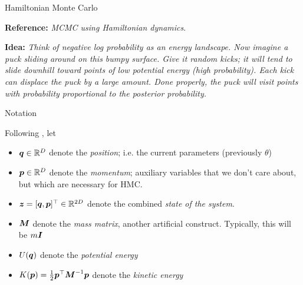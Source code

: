 \documentclass[aspectratio=169]{beamer}
\begin{document}
\begin{frame}{Hamiltonian Monte Carlo}
    
\textbf{Reference:} \citet{Neal2012-ev} \textit{{MCMC} using Hamiltonian dynamics}.

\textbf{Idea: } \textit{Think of negative log probability as an \textit{energy landscape}. Now imagine a puck sliding around on this bumpy surface. Give it random kicks; it will tend to slide downhill toward points of low potential energy (high probability). Each kick can displace the puck by a large amount. Done properly, the puck will visit points with probability proportional to the posterior probability. }
    
\end{frame}

\begin{frame}{Notation}
    
    Following \citet{Neal2012-ev}, let
    
    \begin{itemize}
        \item $\boldsymbol{q} \in \mathbb{R}^D$ denote the \textit{position}; i.e. the current parameters (previously $\theta$)
        \item $\boldsymbol{p} \in \mathbb{R}^D$ denote the \textit{momentum}; auxiliary variables that we don't care about, but which are necessary for HMC.
        \item $\boldsymbol{z} = [\boldsymbol{q}, \boldsymbol{p}]^\top \in \mathbb{R}^{2D}$ denote the combined \textit{state of the system}.
        \item $\boldsymbol{M}$ denote the \textit{mass matrix}, another artificial construct. Typically, this will be $m \boldsymbol{I}$
        \item $U(\boldsymbol{q})$ denote the \textit{potential energy}
        \item $K(\boldsymbol{p}) = \frac{1}{2} \boldsymbol{p}^\top \boldsymbol{M}^{-1} \boldsymbol{p}$ denote the \textit{kinetic energy}
    \end{itemize}
    
\end{frame}
\end{document}
